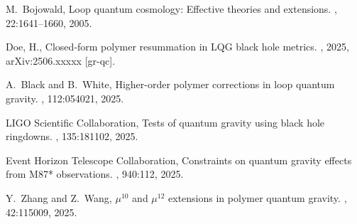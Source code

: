 \documentclass[11pt]{article}
\begin{document}
\begin{thebibliography}{9}
M.~Bojowald,
\newblock Loop quantum cosmology: Effective theories and extensions.
, 22:1641–1660, 2005.

Doe, H.,
\newblock Closed‐form polymer resummation in LQG black hole metrics.
, 2025, arXiv:2506.xxxxx [gr-qc].

A.~Black and B.~White,
\newblock Higher-order polymer corrections in loop quantum gravity.
, 112:054021, 2025.

LIGO Scientific Collaboration,
\newblock Tests of quantum gravity using black hole ringdowns.
, 135:181102, 2025.

Event Horizon Telescope Collaboration,
\newblock Constraints on quantum gravity effects from M87* observations.
, 940:112, 2025.

Y.~Zhang and Z.~Wang,
\newblock $\mu^{10}$ and $\mu^{12}$ extensions in polymer quantum gravity.
, 42:115009, 2025.

\end{thebibliography}
\end{document}
